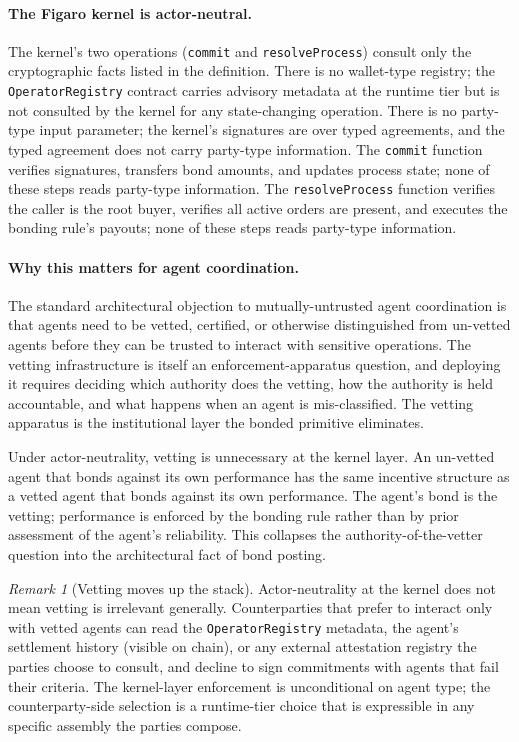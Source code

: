 \documentclass[11pt,a4paper]{article}
\theoremstyle{definition}
\theoremstyle{remark}
\newtheorem{remark}[theorem]{Remark}
\begin{document}
\paragraph{The Figaro kernel is actor-neutral.}
The kernel's two operations (\texttt{commit} and
\texttt{resolveProcess}) consult only the cryptographic facts
listed in the definition. There is no wallet-type registry; the
\texttt{OperatorRegistry} contract carries advisory metadata at the
runtime tier but is not consulted by the kernel for any
state-changing operation. There is no party-type input parameter;
the kernel's signatures are over typed agreements, and the typed
agreement does not carry party-type information. The
\texttt{commit} function verifies signatures, transfers bond
amounts, and updates process state; none of these steps reads
party-type information. The \texttt{resolveProcess} function
verifies the caller is the root buyer, verifies all active orders
are present, and executes the bonding rule's payouts; none of
these steps reads party-type information.

\paragraph{Why this matters for agent coordination.}
The standard architectural objection to mutually-untrusted agent
coordination is that agents need to be vetted, certified, or
otherwise distinguished from un-vetted agents before they can be
trusted to interact with sensitive operations. The vetting
infrastructure is itself an enforcement-apparatus question, and
deploying it requires deciding which authority does the vetting,
how the authority is held accountable, and what happens when an
agent is mis-classified. The vetting apparatus is the institutional
layer the bonded primitive eliminates.

Under actor-neutrality, vetting is unnecessary at the kernel layer.
An un-vetted agent that bonds against its own performance has the
same incentive structure as a vetted agent that bonds against its
own performance. The agent's bond is the vetting; performance is
enforced by the bonding rule rather than by prior assessment of
the agent's reliability. This collapses the
authority-of-the-vetter question into the architectural fact of
bond posting.

\begin{remark}[Vetting moves up the stack]
Actor-neutrality at the kernel does not mean vetting is irrelevant
generally. Counterparties that prefer to interact only with vetted
agents can read the \texttt{OperatorRegistry} metadata, the
agent's settlement history (visible on chain), or any external
attestation registry the parties choose to consult, and decline to
sign commitments with agents that fail their criteria. The
kernel-layer enforcement is unconditional on agent type; the
counterparty-side selection is a runtime-tier choice that is
expressible in any specific assembly the parties compose.
\end{remark}
\end{document}
